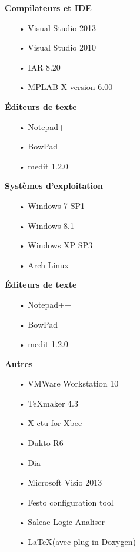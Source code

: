 \documentclass[10pt,a4paper,final]{article}
\begin{document}
\begin{spacing}{1.5}
\begin{flushleft}
\begin{multicols}{3}
\textbf{Compilateurs et IDE}
\begin{itemize}
\item[•]Visual Studio 2013
\item[•]Visual Studio 2010
\item[•]IAR 8.20
\item[•]MPLAB X version 6.00
\end{itemize}

\textbf{Éditeurs de texte}
\begin{itemize}
\item[•]Notepad++
\item[•]BowPad
\item[•]medit 1.2.0
\end{itemize}

\textbf{Systèmes d'exploitation}
\begin{itemize}
\item[•]Windows 7 SP1
\item[•]Windows 8.1
\item[•]Windows XP SP3

\item[•]Arch Linux
\end{itemize}

\textbf{Éditeurs de texte}
\begin{itemize}
\item[•]Notepad++
\item[•]BowPad
\item[•]medit 1.2.0
\end{itemize}

\textbf{Autres}
\begin{itemize}
\item[•]VMWare Workstation 10
\item[•]TeXmaker 4.3
\item[•]X-ctu for Xbee
\item[•]Dukto R6
\item[•]Dia
\item[•]Microsoft Visio 2013
\item[•]Festo configuration tool
\item[•]Saleae Logic Analiser
\item[•]\LaTeX (avec plug-in Doxygen)
\end{itemize}

\end{multicols}
\end{flushleft}
\begin{flushleft}
\HRule
\end{flushleft}


\end{spacing}
\end{document}
